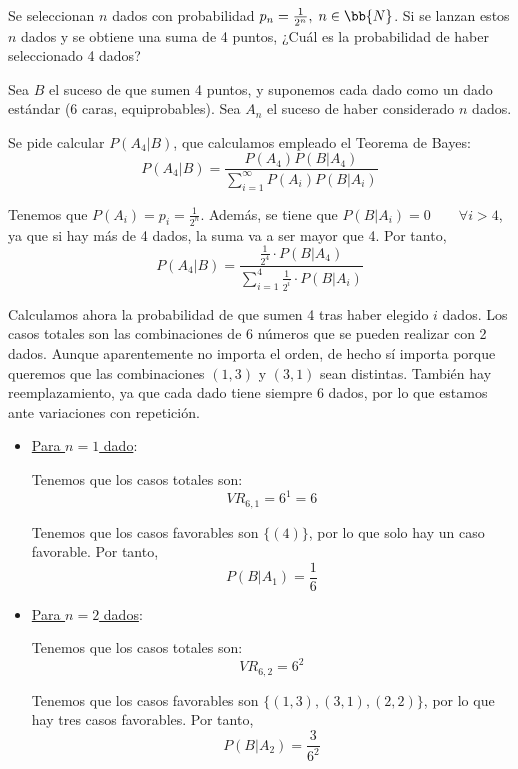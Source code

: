 \begin{ejercicio} \label{ej:4.Ejercicio11}
    Se seleccionan $n$ dados con probabilidad $p_n=\frac{1}{2^n},\;n\in \bb{N}$. Si se lanzan estos $n$ dados y se obtiene una suma de 4 puntos, ¿Cuál es la probabilidad de haber seleccionado 4 dados?

    Sea $B$ el suceso de que sumen 4 puntos, y suponemos cada dado como un dado estándar (6 caras, equiprobables). Sea $A_n$ el suceso de haber considerado $n$ dados.

    Se pide calcular $P(A_4|B)$, que calculamos empleado el Teorema de Bayes:
    \begin{equation*}
        P(A_4|B) = \frac{P(A_4)P(B|A_4)}{\displaystyle \sum_{i=1}^{\infty}P(A_i)P(B|A_i)}
    \end{equation*}

    Tenemos que $P(A_i)=p_i=\frac{1}{2^n}$. Además, se tiene que $P(B|A_i)=0 \qquad \forall i>4$, ya que si hay más de 4 dados, la suma va a ser mayor que 4. Por tanto,
    \begin{equation*}
        P(A_4|B) = \frac{\frac{1}{2^4}\cdot P(B|A_4)}{\displaystyle \sum_{i=1}^{4}\frac{1}{2^i}\cdot P(B|A_i)}
    \end{equation*}

    Calculamos ahora la probabilidad de que sumen 4 tras haber elegido $i$ dados. Los casos totales son las combinaciones de 6 números que se pueden realizar con 2 dados. Aunque aparentemente no importa el orden, de hecho sí importa porque queremos que las combinaciones $(1,3)$ y $(3,1)$ sean distintas. También hay reemplazamiento, ya que cada dado tiene siempre 6 dados, por lo que estamos ante variaciones con repetición.
    \begin{itemize}
        \item \underline{Para $n=1$ dado}:

        Tenemos que los casos totales son: $$VR_{6,1} = 6^1 = 6$$

        Tenemos que los casos favorables son $\{(4)\}$, por lo que solo hay un caso favorable. Por tanto,
        \begin{equation*}
            P(B|A_1)=\frac{1}{6}
        \end{equation*}

        \item \underline{Para $n=2$ dados}:

        Tenemos que los casos totales son: $$VR_{6,2} = 6^2$$

        Tenemos que los casos favorables son $\{(1,3), (3,1), (2,2)\}$, por lo que hay tres casos favorables. Por tanto,
        \begin{equation*}
            P(B|A_2)=\frac{3}{6^2}
        \end{equation*}


\end{itemize}
\end{ejercicio}
